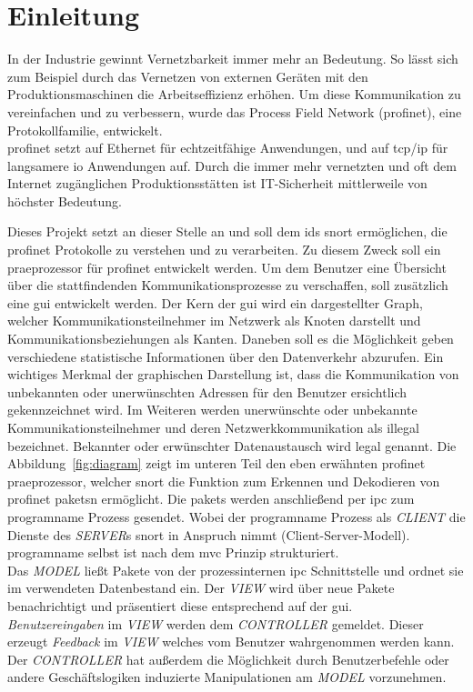 \chapter{Einleitung}

In der Industrie gewinnt Vernetzbarkeit immer mehr an Bedeutung. So lässt sich zum Beispiel durch das Vernetzen von externen Geräten mit den Produktionsmaschinen die Arbeitseffizienz erhöhen. Um diese Kommunikation zu vereinfachen und zu verbessern, wurde das Process Field Network (\gls{profinet}), eine Protokollfamilie, entwickelt.\\
\gls{profinet} setzt auf Ethernet für echtzeitfähige Anwendungen, und auf \gls{tcp}/\gls{ip} für langsamere \gls{io} Anwendungen auf. Durch die immer mehr vernetzten und oft dem Internet zugänglichen Produktionsstätten ist IT-Sicherheit mittlerweile von höchster Bedeutung. \par
Dieses Projekt setzt an dieser Stelle an und soll dem \gls{ids} \gls{snort} ermöglichen, die \gls{profinet} Protokolle zu verstehen und zu verarbeiten. Zu diesem Zweck soll ein \gls{praeprozessor} für \gls{profinet} entwickelt werden. Um dem Benutzer eine Übersicht über die stattfindenden Kommunikationsprozesse zu verschaffen, soll zusätzlich eine \gls{gui} entwickelt werden. Der Kern der \gls{gui} wird ein dargestellter Graph, welcher Kommunikationsteilnehmer im Netzwerk als Knoten darstellt und Kommunikationsbeziehungen als Kanten. Daneben soll es die Möglichkeit geben verschiedene statistische Informationen über den Datenverkehr abzurufen.
Ein wichtiges Merkmal der graphischen Darstellung ist, dass die Kommunikation von unbekannten oder unerwünschten Adressen für den Benutzer ersichtlich gekennzeichnet wird. Im Weiteren werden unerwünschte oder unbekannte Kommunikationsteilnehmer und deren Netzwerkkommunikation als illegal bezeichnet. Bekannter oder erwünschter Datenaustausch wird legal genannt.
Die Abbildung~\ref{fig:diagram} zeigt im unteren Teil den eben erwähnten \gls{profinet} \gls{praeprozessor}, welcher \gls{snort} die Funktion zum Erkennen und Dekodieren von \gls{profinet} \glspl{paket}n ermöglicht. Die \glspl{paket} werden anschließend per \gls{ipc} zum \gls{programname} Prozess gesendet. Wobei der \gls{programname} Prozess als \textit{CLIENT} die Dienste des \textit{SERVER}s \gls{snort} in Anspruch nimmt (Client-Server-Modell).\\
\Gls{programname} selbst ist nach dem \gls{mvc} Prinzip strukturiert.\\
Das \textit{MODEL} ließt Pakete von der prozessinternen \gls{ipc} Schnittstelle und ordnet sie im verwendeten Datenbestand ein. Der \textit{VIEW} wird über neue Pakete benachrichtigt und präsentiert diese entsprechend auf der \gls{gui}.\\
\textit{Benutzereingaben} im \textit{VIEW} werden dem \textit{CONTROLLER} gemeldet. Dieser erzeugt \textit{Feedback} im \textit{VIEW} welches vom Benutzer wahrgenommen werden kann. Der \textit{CONTROLLER} hat außerdem die Möglichkeit durch Benutzerbefehle oder andere Geschäftslogiken induzierte Manipulationen am \textit{MODEL} vorzunehmen.

